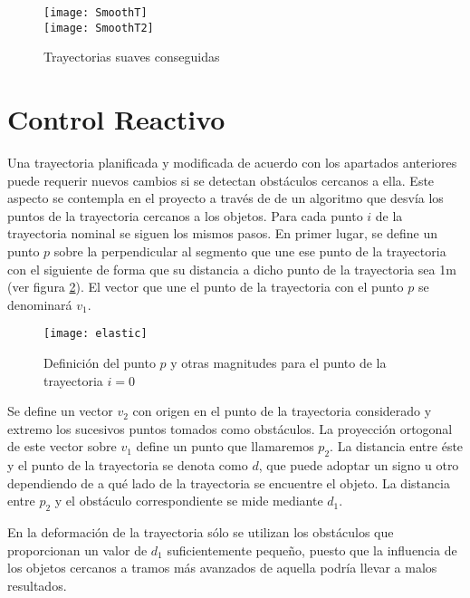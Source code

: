 \begin{figure}[hbt]
  \centering\texttt{[image: SmoothT]}\\
  \vspace{0.2cm}
  \texttt{[image: SmoothT2]}\label{fg:smoothT}
  \caption{Trayectorias suaves conseguidas}
\end{figure}

\section{Control Reactivo}\label{reactivo}

Una trayectoria planificada y modificada de acuerdo con los apartados anteriores puede requerir nuevos cambios si se detectan obstáculos cercanos a ella. Este aspecto se contempla en el proyecto a través de de un algoritmo que desvía los puntos de la trayectoria cercanos a los objetos. Para cada punto $i$ de la trayectoria nominal se siguen los mismos pasos. En primer lugar, se define un punto $p$ sobre la perpendicular al segmento que une ese punto de la trayectoria con el siguiente de forma que su distancia a dicho punto de la trayectoria sea 1m (ver figura \ref{fg:elastic}). El vector que une el punto de la trayectoria con el punto $p$ se denominará $v_{1}$.

\begin{figure}[hbt]
  \centering\texttt{[image: elastic]}\\
  \caption{Definición del punto $p$ y otras magnitudes para el punto de la trayectoria $i = 0$}\label{fg:elastic}
\end{figure}


\pagebreak[4]
Se define un vector $v_{2}$ con origen en el punto de la trayectoria considerado y extremo los sucesivos puntos tomados como obstáculos. La proyección ortogonal de este vector sobre $v_{1}$ define un punto que llamaremos $p_{2}$. La distancia entre éste y el punto de la trayectoria se denota como $d$, que puede adoptar un signo u otro dependiendo de a qué lado de la trayectoria se encuentre el objeto. La distancia entre $p_{2}$ y el obstáculo correspondiente se mide mediante $d_{1}$.

En la deformación de la trayectoria sólo se utilizan los obstáculos que proporcionan un valor de $d_{1}$ suficientemente pequeño, puesto que la influencia de los objetos cercanos a tramos más avanzados de aquella podría llevar a malos resultados.

